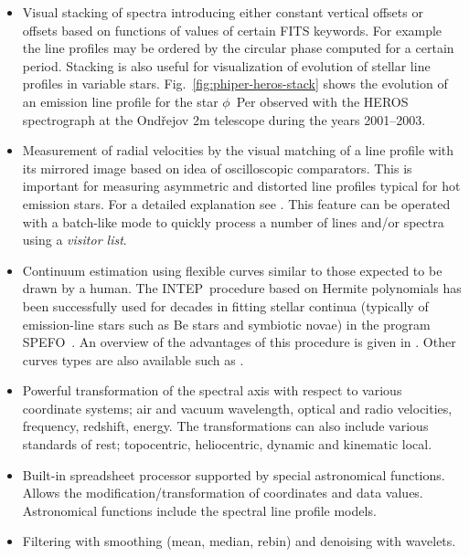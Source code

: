 \documentclass[final,authoryear,5p,times,twocolumn]{elsarticle}
\newcommand{\spefo}{\textsf{\small SPEFO}}
\newcommand{\intep}{\textsf{\small INTEP}}
\begin{document}
\begin{itemize}

\item Visual stacking of spectra introducing either constant vertical offsets
or offsets based on functions of values of certain FITS keywords. For example
the line profiles may be ordered by the circular phase computed for a certain
period. Stacking is also useful for visualization of evolution of stellar line
profiles in variable stars.  Fig.~\ref{fig:phiper-heros-stack} shows the
evolution of an emission line profile for the star $\phi$~Per observed with the
HEROS spectrograph \citep{2002PAICz..90....1S} at the Ond\v{r}ejov 2m telescope
during the years 2001--2003.

\item Measurement of radial velocities by the visual matching of a line profile
with its mirrored image based on idea of oscilloscopic comparators.  This is
important for measuring asymmetric and distorted line profiles typical for hot
emission stars. For a detailed explanation see \citet{2007IAUS..240..486P}.
This feature can be operated with a batch-like mode to quickly process a number
of lines and/or spectra using a \emph{visitor list}.

\item Continuum estimation using flexible curves similar to those expected to
be drawn by a human. The \intep\ procedure based on Hermite polynomials
\citep{1982PDAO...16...67H} has been successfully used for decades in fitting
stellar continua (typically of emission-line stars such as Be stars and
symbiotic novae) in the program \spefo\ \citep{1996ASPC..101..187S}. An
overview of the advantages of this procedure is given in
\citet{2008asvo.proc...97S}. Other curves types are also available such as
\citet{Akima:1970:NMI:321607.321609}.

\item Powerful transformation of the spectral axis with respect to various
coordinate systems; air and vacuum wavelength, optical and radio velocities,
frequency, redshift, energy. The transformations can also include various
standards of rest; topocentric, heliocentric, dynamic and kinematic local.

\item Built-in spreadsheet processor supported by special astronomical
functions. Allows the modification/transformation of coordinates and data
values. Astronomical functions include the spectral line profile models.

\item Filtering with smoothing (mean, median, rebin) and denoising with
wavelets.


\end{itemize}
\end{document}

